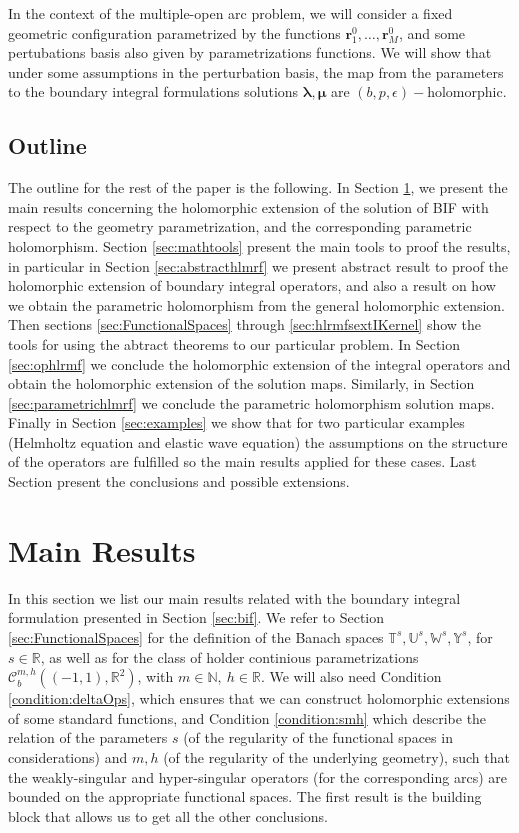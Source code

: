 \documentclass{article}
\newcommand{\bmu} {\bm{\mu}}
\newcommand{\IN}{{\mathbb N}}
\newcommand{\IR}{{\mathbb R}}
\newcommand{\IU}{{\mathbb U}}
\newcommand{\IT}{{\mathbb T}}
\newcommand{\IW}{{\mathbb W}}
\newcommand{\IY}{{\mathbb Y}}
\newcommand{\rgeoh}[2]{\mathcal{C}_b^{#1,#2}\left( (-1,1), \IR^2 \right)}
\newcommand{\bla}{\boldsymbol \lambda}
\newcommand{\br}{\bm{r}}
\begin{document}
In the context of the multiple-open arc problem, we will consider a fixed geometric configuration parametrized by the functions $\br_1^0 ,\hdots, \br_M^0$, and some pertubations basis also given by parametrizations functions. We will show that under some assumptions in the perturbation basis, the map from the parameters to the boundary integral formulations solutions $\bla,\bmu$ are $(b,p,\epsilon)-$holomorphic.
\subsection{Outline}
The outline for the rest of the paper is the following. In Section \ref{sec:MainResult}, we present the main results concerning the holomorphic extension of the solution of BIF with respect to the geometry parametrization, and the corresponding parametric holomorphism. Section \ref{sec:mathtools} present the main tools to proof the results, in particular in Section \ref{sec:abstracthlmrf}  we present abstract result to proof the holomorphic extension of boundary integral operators, and also a result on how we obtain the parametric holomorphism from the general holomorphic extension. Then sections \ref{sec:FunctionalSpaces} through \ref{sec:hlrmfsextIKernel} show the tools for using the abtract theorems to our particular problem. 
In Section \ref{sec:ophlrmf} we conclude the holomorphic extension of the integral operators and obtain the holomorphic extension of the solution maps. Similarly, in Section \ref{sec:parametrichlmrf} we conclude the parametric holomorphism  solution maps. 
Finally in Section \ref{sec:examples} we show that for two particular examples (Helmholtz equation and elastic wave equation) the assumptions on the structure of the operators are fulfilled so the main results applied for these cases. Last Section present the conclusions and possible extensions. 
\section{Main Results}
\label{sec:MainResult}
In this section we list our main results related with the boundary integral formulation presented in Section \ref{sec:bif}. We refer to Section \ref{sec:FunctionalSpaces} for the definition of the Banach spaces $\IT^s,\IU^s,\IW^s,\IY^s$, for $s \in \IR$, as well as for the class of holder continious parametrizations $\rgeoh{m}{h}$, with $m \in \IN, \ h\in \IR$. We will also need Condition \ref{condition:deltaOps}, which ensures that we can construct holomorphic extensions of some standard functions, and Condition \ref{condition:smh} which describe the relation of the parameters $s$ (of the regularity of the functional spaces in considerations) and $m,h$ (of the regularity of the underlying geometry), such that the weakly-singular and hyper-singular operators (for the corresponding arcs) are bounded on the appropriate functional spaces. The first result is the building block that allows us to get all the other conclusions.
\end{document}
